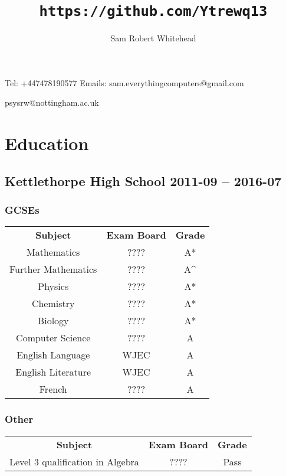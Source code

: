\documentclass[9pt]{extarticle}
\renewcommand{\maketitle}{\begin{center}\huge\bfseries\theauthor\end{center}\begin{center}\Large\thetitle\end{center}}
\begin{document}
    \title{\texttt{https://github.com/Ytrewq13}}
    \author{Sam Robert Whitehead}

    \maketitle

    Tel: +447478190577
    \hfill
    Emails: sam.everythingcomputers@gmail.com
    \begin{flushright}
        psysrw@nottingham.ac.uk
    \end{flushright}
    \section{Education}
    \subsection{Kettlethorpe High School
    \hfill 2011-09 -- 2016-07}
    \begin{multicols}{2}
        \subsubsection{GCSEs}
        \begin{tabular}{ccc}
            \textbf{Subject} & \textbf{Exam Board} & \textbf{Grade} \\
            Mathematics & ???? & A* \\
            Further Mathematics & ???? & A\textasciicircum \\
            Physics & ???? & A* \\
            Chemistry & ???? & A* \\
            Biology & ???? & A* \\
            Computer Science & ???? & A \\
            English Language & WJEC & A \\
            English Literature & WJEC & A \\
            French & ???? & A \\
        \end{tabular}
        \subsubsection{Other}
        \begin{tabular}{ccc}
            \textbf{Subject} & \textbf{Exam Board} & \textbf{Grade} \\
            Level 3 qualification in Algebra & ???? & Pass \\
        \end{tabular}
    \end{multicols}
\end{document}
